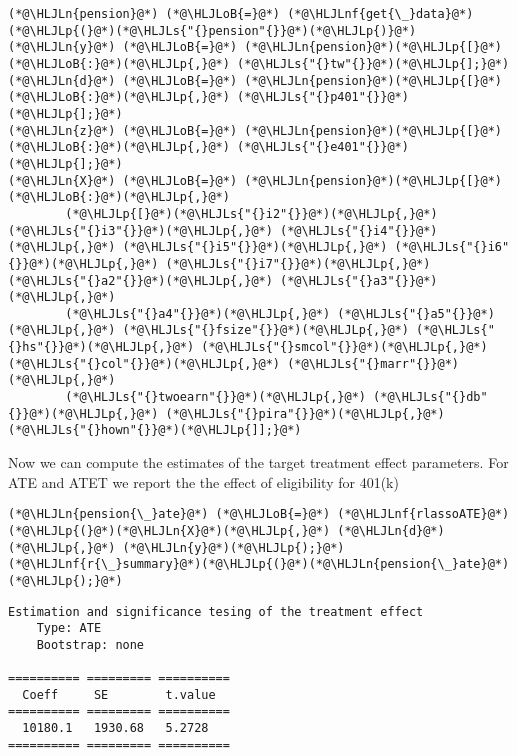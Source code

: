 \documentclass[12pt,a4paper]{article}
\newcommand{\HLJLn}[1]{#1}
\newcommand{\HLJLnf}[1]{\textcolor[RGB]{66,102,213}{#1}}
\newcommand{\HLJLs}[1]{\textcolor[RGB]{201,61,57}{#1}}
\newcommand{\HLJLoB}[1]{\textcolor[RGB]{102,102,102}{\textbf{#1}}}
\newcommand{\HLJLp}[1]{#1}
\begin{document}
\begin{lstlisting}
(*@\HLJLn{pension}@*) (*@\HLJLoB{=}@*) (*@\HLJLnf{get{\_}data}@*)(*@\HLJLp{(}@*)(*@\HLJLs{"{}pension"{}}@*)(*@\HLJLp{)}@*)
(*@\HLJLn{y}@*) (*@\HLJLoB{=}@*) (*@\HLJLn{pension}@*)(*@\HLJLp{[}@*)(*@\HLJLoB{:}@*)(*@\HLJLp{,}@*) (*@\HLJLs{"{}tw"{}}@*)(*@\HLJLp{];}@*)
(*@\HLJLn{d}@*) (*@\HLJLoB{=}@*) (*@\HLJLn{pension}@*)(*@\HLJLp{[}@*)(*@\HLJLoB{:}@*)(*@\HLJLp{,}@*) (*@\HLJLs{"{}p401"{}}@*)(*@\HLJLp{];}@*)
(*@\HLJLn{z}@*) (*@\HLJLoB{=}@*) (*@\HLJLn{pension}@*)(*@\HLJLp{[}@*)(*@\HLJLoB{:}@*)(*@\HLJLp{,}@*) (*@\HLJLs{"{}e401"{}}@*)(*@\HLJLp{];}@*)
(*@\HLJLn{X}@*) (*@\HLJLoB{=}@*) (*@\HLJLn{pension}@*)(*@\HLJLp{[}@*)(*@\HLJLoB{:}@*)(*@\HLJLp{,}@*) 
        (*@\HLJLp{[}@*)(*@\HLJLs{"{}i2"{}}@*)(*@\HLJLp{,}@*) (*@\HLJLs{"{}i3"{}}@*)(*@\HLJLp{,}@*) (*@\HLJLs{"{}i4"{}}@*)(*@\HLJLp{,}@*) (*@\HLJLs{"{}i5"{}}@*)(*@\HLJLp{,}@*) (*@\HLJLs{"{}i6"{}}@*)(*@\HLJLp{,}@*) (*@\HLJLs{"{}i7"{}}@*)(*@\HLJLp{,}@*) (*@\HLJLs{"{}a2"{}}@*)(*@\HLJLp{,}@*) (*@\HLJLs{"{}a3"{}}@*)(*@\HLJLp{,}@*) 
        (*@\HLJLs{"{}a4"{}}@*)(*@\HLJLp{,}@*) (*@\HLJLs{"{}a5"{}}@*)(*@\HLJLp{,}@*) (*@\HLJLs{"{}fsize"{}}@*)(*@\HLJLp{,}@*) (*@\HLJLs{"{}hs"{}}@*)(*@\HLJLp{,}@*) (*@\HLJLs{"{}smcol"{}}@*)(*@\HLJLp{,}@*) (*@\HLJLs{"{}col"{}}@*)(*@\HLJLp{,}@*) (*@\HLJLs{"{}marr"{}}@*)(*@\HLJLp{,}@*) 
        (*@\HLJLs{"{}twoearn"{}}@*)(*@\HLJLp{,}@*) (*@\HLJLs{"{}db"{}}@*)(*@\HLJLp{,}@*) (*@\HLJLs{"{}pira"{}}@*)(*@\HLJLp{,}@*) (*@\HLJLs{"{}hown"{}}@*)(*@\HLJLp{]];}@*)
\end{lstlisting}


Now we can compute the estimates of the target treatment effect parameters. For ATE and ATET we report the the effect of eligibility for 401(k)


\begin{lstlisting}
(*@\HLJLn{pension{\_}ate}@*) (*@\HLJLoB{=}@*) (*@\HLJLnf{rlassoATE}@*)(*@\HLJLp{(}@*)(*@\HLJLn{X}@*)(*@\HLJLp{,}@*) (*@\HLJLn{d}@*)(*@\HLJLp{,}@*) (*@\HLJLn{y}@*)(*@\HLJLp{);}@*)
(*@\HLJLnf{r{\_}summary}@*)(*@\HLJLp{(}@*)(*@\HLJLn{pension{\_}ate}@*)(*@\HLJLp{);}@*)
\end{lstlisting}

\begin{lstlisting}
Estimation and significance tesing of the treatment effect
    Type: ATE
    Bootstrap: none
    
========== ========= ==========
  Coeff     SE        t.value
========== ========= ==========
  10180.1   1930.68   5.2728
========== ========= ==========
\end{lstlisting}
\end{document}
